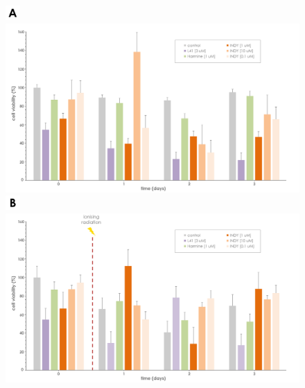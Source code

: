 \documentclass[onecolumn,10pt]{asme2ej}
\begin{document}
\newpage
\begin{figure}[h]
	\includegraphics[width=0.05\textwidth]{figures/a}
	
	
	\includegraphics[width=1 \textwidth]{figures/ab_vm.jpg}
	
	\includegraphics[width=0.05\textwidth]{figures/b}
	
	
	\includegraphics[width=1\textwidth]{figures/abir_vm.jpg}
	

\end{figure}
\end{document}
